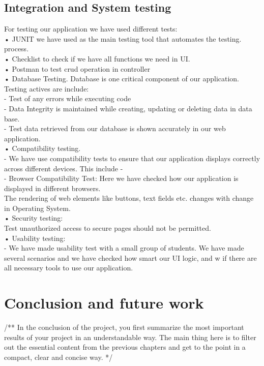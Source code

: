 \documentclass{scrartcl}
\begin{document}
\subsection{Integration and System testing}
For testing  our application we have used different tests:\\
• JUNIT we have used as the main testing tool that automates the testing.\\ process.\\
• Checklist to check if we have all functions we need in UI.\\
• Postman to test crud operation in controller\\
• Database Testing. Database is one critical component of our application. Testing actives are include:\\
 - Test of any errors while executing code\\
 - Data Integrity is maintained while creating, updating or deleting data in data base.\\
 - Test data retrieved from our database is shown accurately in our web application.\\
• Compatibility testing.\\
 - We have use compatibility tests to ensure that our application displays correctly across different devices. This include -\\
 - Browser Compatibility Test: Here we have checked how our application is displayed in different browsers.\\
   The rendering of web elements like buttons, text fields etc. changes with change in Operating System.\\
• Security testing: \\
   Test unauthorized access to secure pages should not be permitted.\\
• Usability testing:\\
  - We have made usability test with a small group of students. We have made several scenarios and we have checked how smart our UI logic, and w if there are all necessary tools to use our application.\\



\section{Conclusion and future work}
/**
 In the conclusion of the project, you first summarize the most important results of your project in an understandable way. The main thing here is to filter out the essential content from the previous chapters and get to the point in a compact, clear and concise way.
*/
\lipsum[6-7]
\end{document}
